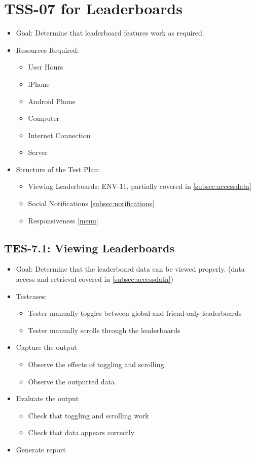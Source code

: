 \section{TSS-07 for Leaderboards}
\begin{itemize}
\item Goal: Determine that leaderboard features work as required.

\item Resources Required: 
\begin{itemize}
\item User Hours 
\item iPhone 
\item Android Phone 
\item Computer 
\item Internet Connection 
\item Server
\end{itemize}

\item Structure of the Test Plan: 
\begin{itemize}
\item Viewing Leaderboards: ENV-11, partially covered in \ref{subsec:accessdata}
\item Social Notifications \ref{subsec:notifications}
\item Responsiveness \ref{menu}
\end{itemize}
\end{itemize}

\subsection{TES-7.1: Viewing Leaderboards}
\begin{itemize}
\item Goal: Determine that the leaderboard data can be viewed properly. (data 
access and retrieval covered in \ref{subsec:accessdata})
\item Testcases: 
\begin{itemize}
\item Tester manually toggles between global and friend-only leaderboards
\item Tester manually scrolls through the leaderboards
\end{itemize}
\item Capture the output 
\begin{itemize}
\item Observe the effects of toggling and scrolling
\item Observe the outputted data
\end{itemize}
\item Evaluate the output 
\begin{itemize}
\item Check that toggling and scrolling work
\item Check that data appears correctly
\end{itemize}
\item Generate report 
\end{itemize}

